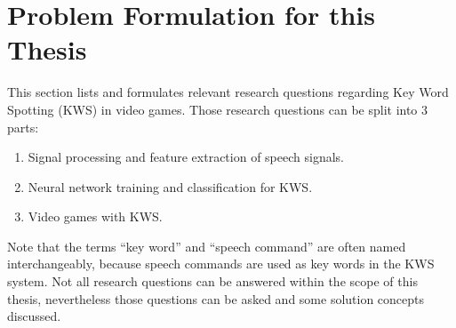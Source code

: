 
\section{Problem Formulation for this Thesis}\label{sec:intro_rq}
\thesisStateRevised
This section lists and formulates relevant research questions regarding Key Word Spotting (KWS) in video games.
Those research questions can be split into 3 parts:
\begin{enumerate}[label={Q.\arabic*)}, leftmargin=1.4cm]
    \item Signal processing and feature extraction of speech signals.
    \item Neural network training and classification for KWS.
    \item Video games with KWS.
\end{enumerate}
Note that the terms \enquote{key word} and \enquote{speech command} are often named interchangeably, because speech commands are used as key words in the KWS system.
Not all research questions can be answered within the scope of this thesis, nevertheless those questions can be asked and some solution concepts discussed.




